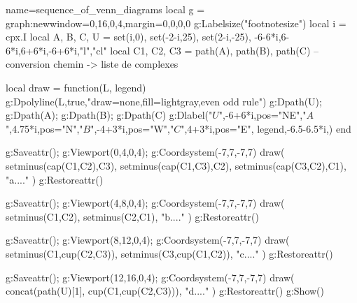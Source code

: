 \documentclass[border=5pt]{standalone}%
\begin{document}
\begin{luadraw}{name=sequence_of_venn_diagrams}
local g = graph:new{window={0,16,0,4},margin={0,0,0,0}}
g:Labelsize("footnotesize")
local i = cpx.I
local A, B, C, U = set(i,0), set(-2-i,25), set(2-i,-25), {-6-6*i,6-6*i,6+6*i,-6+6*i,"l","cl"}
local C1, C2, C3 = path(A), path(B), path(C) -- conversion chemin -> liste de complexes

local draw = function(L, legend)
    g:Dpolyline(L,true,"draw=none,fill=lightgray,even odd rule")
    g:Dpath(U); g:Dpath(A); g:Dpath(B); g:Dpath(C)
    g:Dlabel("$U$",-6+6*i,{pos="NE"},"$A$",4.75*i,{pos="N"},"$B$",-4+3*i,{pos="W"},"$C$",4+3*i,{pos="E"},
    legend,-6.5-6.5*i,{})
end

g:Saveattr(); g:Viewport(0,4,0,4); g:Coordsystem(-7,7,-7,7)
draw( {setminus(cap(C1,C2),C3), setminus(cap(C1,C3),C2), setminus(cap(C3,C2),C1)}, "a...." )
g:Restoreattr()

g:Saveattr(); g:Viewport(4,8,0,4); g:Coordsystem(-7,7,-7,7)
draw( {setminus(C1,C2), setminus(C2,C1)}, "b...." )
g:Restoreattr()

g:Saveattr(); g:Viewport(8,12,0,4); g:Coordsystem(-7,7,-7,7)
draw( {setminus(C1,cup(C2,C3)), setminus(C3,cup(C1,C2))}, "c...." )
g:Restoreattr()

g:Saveattr(); g:Viewport(12,16,0,4); g:Coordsystem(-7,7,-7,7)
draw( concat(path(U)[1], cup(C1,cup(C2,C3))), "d...." )
g:Restoreattr()
g:Show()
\end{luadraw}
\end{document}
